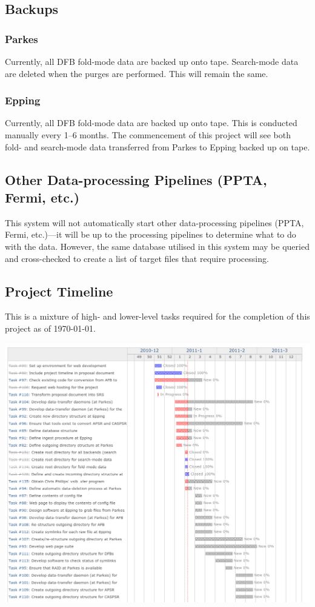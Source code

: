 \documentclass[a4paper,11pt]{article}
\begin{document}
\subsection{Backups}
\subsubsection{Parkes}
Currently, all DFB fold-mode data are backed up onto tape. Search-mode data are deleted when the purges are performed. This will remain the same.

\subsubsection{Epping}
Currently, all DFB fold-mode data are backed up onto tape. This is conducted manually every 1--6 months. The commencement of this project will see both fold- and search-mode data transferred from Parkes to Epping backed up on tape.

\subsection{Other Data-processing Pipelines (PPTA, Fermi, etc.)}
This system will not automatically start other data-processing pipelines (PPTA, Fermi, etc.)---it will be up to the processing pipelines to determine what to do with the data. However, the same database utilised in this system may be queried and cross-checked to create a list of target files that require processing.

\subsection{Project Timeline}
This is a mixture of high- and lower-level tasks required for the completion of this project as of \today.

\includegraphics[scale=0.4]{timeline.png}
\end{document}
